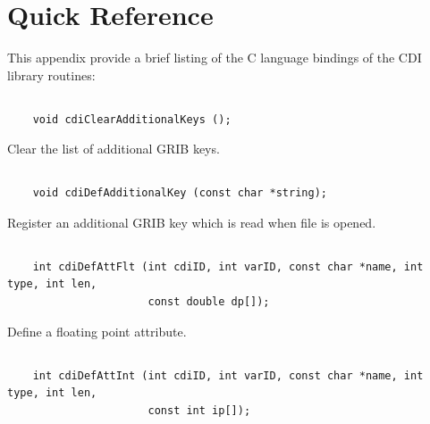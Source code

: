 \chapter*{Quick Reference}

This appendix provide a brief listing of the C language bindings of the CDI library routines:

\section*{\tt {}}

\begin{verbatim}
    void cdiClearAdditionalKeys ();
\end{verbatim}

Clear the list of additional GRIB keys.


\section*{\tt {}}

\begin{verbatim}
    void cdiDefAdditionalKey (const char *string);
\end{verbatim}

Register an additional GRIB key which is read when file is opened.


\section*{\tt {}}

\begin{verbatim}
    int cdiDefAttFlt (int cdiID, int varID, const char *name, int type, int len,
                      const double dp[]);
\end{verbatim}

Define a floating point attribute.


\section*{\tt {}}

\begin{verbatim}
    int cdiDefAttInt (int cdiID, int varID, const char *name, int type, int len,
                      const int ip[]);
\end{verbatim}

